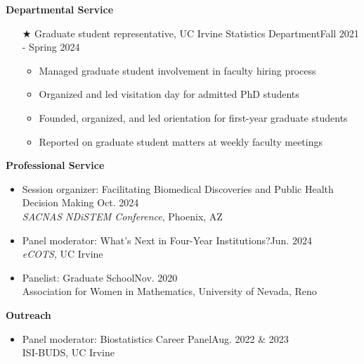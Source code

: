 \documentclass{article}
\begin{document}
	\newpage
	\begin{description}
		\vspace{-2mm}
		\item[Service and Outreach]\hspace*{.1in} 
		
		\textbf{Departmental Service}
		\begin{itemize}
			\item[$\bigstar$] Graduate student representative, UC Irvine Statistics Department\hfill{Fall 2021 - Spring 2024}
			\begin{itemize}
				\item Managed graduate student involvement in faculty hiring process
				\vspace*{-1mm}
				\item Organized and led visitation day for admitted PhD students
				\vspace*{-1mm}
				\item Founded, organized, and led orientation for first-year graduate students
				\vspace*{-1mm}
				\item Reported on graduate student matters at weekly faculty meetings
			\end{itemize}
		\end{itemize}
		
		\textbf{Professional Service}
		\begin{itemize}
			\item Session organizer: Facilitating Biomedical Discoveries and Public Health Decision Making \hfill{Oct. 2024}\\
			\textit{SACNAS NDiSTEM Conference}, Phoenix, AZ
			
			\item Panel moderator: What's Next in Four-Year Institutions?\hfill{Jun. 2024}\\
			\textit{eCOTS}, UC Irvine %
			
			\item Panelist: Graduate School\hfill{Nov. 2020}\\
			Association for Women in Mathematics, University of Nevada, Reno %
		\end{itemize}
		
		\textbf{Outreach}
		\begin{itemize}
			\item Panel moderator: Biostatistics Career Panel\hfill{Aug. 2022 \& 2023}\\
			ISI-BUDS, UC Irvine
			

\end{itemize}
\end{description}
\end{document}
